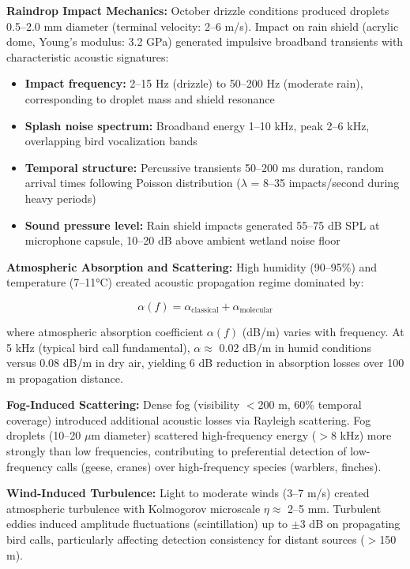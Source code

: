 \documentclass[twocolumn]{article}
\begin{document}
\textbf{Raindrop Impact Mechanics:} October drizzle conditions produced droplets 0.5--2.0 mm diameter (terminal velocity: 2--6 m/s). Impact on rain shield (acrylic dome, Young's modulus: 3.2 GPa) generated impulsive broadband transients with characteristic acoustic signatures:

\begin{itemize}
\item \textbf{Impact frequency:} 2--15 Hz (drizzle) to 50--200 Hz (moderate rain), corresponding to droplet mass and shield resonance
\item \textbf{Splash noise spectrum:} Broadband energy 1--10 kHz, peak 2--6 kHz, overlapping bird vocalization bands
\item \textbf{Temporal structure:} Percussive transients 50--200 ms duration, random arrival times following Poisson distribution ($\lambda$ = 8--35 impacts/second during heavy periods)
\item \textbf{Sound pressure level:} Rain shield impacts generated 55--75 dB SPL at microphone capsule, 10--20 dB above ambient wetland noise floor
\end{itemize}

\textbf{Atmospheric Absorption and Scattering:} High humidity (90--95\%) and temperature (7--11°C) created acoustic propagation regime dominated by:

\begin{equation}
\alpha(f) = \alpha_{\text{classical}} + \alpha_{\text{molecular}}
\end{equation}

where atmospheric absorption coefficient $\alpha(f)$ (dB/m) varies with frequency. At 5 kHz (typical bird call fundamental), $\alpha \approx$ 0.02 dB/m in humid conditions versus 0.08 dB/m in dry air, yielding 6 dB reduction in absorption losses over 100 m propagation distance.

\textbf{Fog-Induced Scattering:} Dense fog (visibility $<$200 m, 60\% temporal coverage) introduced additional acoustic losses via Rayleigh scattering. Fog droplets (10--20 $\mu$m diameter) scattered high-frequency energy ($>$8 kHz) more strongly than low frequencies, contributing to preferential detection of low-frequency calls (geese, cranes) over high-frequency species (warblers, finches).

\textbf{Wind-Induced Turbulence:} Light to moderate winds (3--7 m/s) created atmospheric turbulence with Kolmogorov microscale $\eta \approx$ 2--5 mm. Turbulent eddies induced amplitude fluctuations (scintillation) up to $\pm$3 dB on propagating bird calls, particularly affecting detection consistency for distant sources ($>$150 m).
\end{document}
